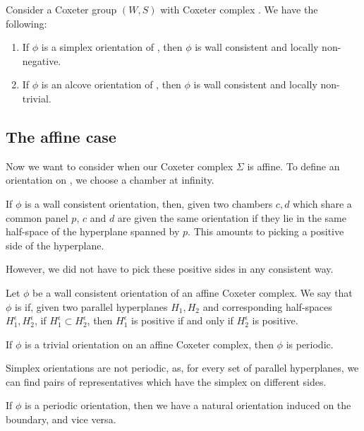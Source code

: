 \documentclass[11pt]{article}
\begin{document}
\begin{lemma}
    Consider a Coxeter group $(W,S)$ with Coxeter complex \sg. We have the following:
    \begin{enumerate}
        \item If $\phi$ is a simplex orientation of \sg, then $\phi$ is wall consistent and locally non-negative.
        \item If $\phi$ is an alcove orientation of \sg, then $\phi$ is wall consistent and locally non-trivial.
    \end{enumerate}
\end{lemma}

\subsection{The affine case}

Now we want to consider when our Coxeter complex $\Sigma$ is affine. To define an orientation on \sg, we choose a chamber at infinity.

If $\phi$ is a wall consistent orientation, then, given two chambers $c,d$ which share a common panel $p$, $c$ and $d$ are given the same orientation if they lie in the same half-space of the hyperplane spanned by $p$. This amounts to picking a positive side of the hyperplane.

However, we did not have to pick these positive sides in any consistent way. 

\begin{definition}
    Let $\phi$ be a wall consistent orientation of an affine Coxeter complex. We say that $\phi$ is  if, given two parallel hyperplanes $H_1,H_2$ and corresponding half-spaces $H_1^{\epsilon},H_2^{\epsilon}$, if $H_1^{\epsilon}\subset H_2^{\epsilon}$, then $H_1^{\epsilon}$ is positive if and only if $H_2^{\epsilon}$ is positive. 
\end{definition}

\begin{example}
    If $\phi$ is a trivial orientation on an affine Coxeter complex, then $\phi$ is periodic. 
\end{example}

\begin{example}
    Simplex orientations are not periodic, as, for every set of parallel hyperplanes, we can find pairs of representatives which have the simplex on different sides.
\end{example}

If $\phi$ is a periodic orientation, then we have a natural orientation induced on the boundary, and vice versa. 
\end{document}
